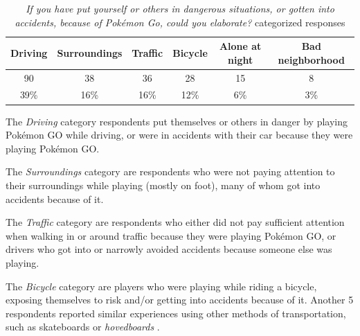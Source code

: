 \begin{table}[h]
	\centering
	\caption{\emph{If you have put yourself or others in dangerous situations, or gotten into accidents, because of Pokémon Go, could you elaborate?} categorized responses}
	\label{tbl:danger-or-accidents-elaboration}
	\begin{tabular}{|c|c|c|c|c|c|}
		\hline
		Driving	& Surroundings	& Traffic	& Bicycle	& Alone at night	& Bad neighborhood\\
		\hline\hline
		90		& 38			& 36		& 28		& 15				& 8\\
		39\%	& 16\%			& 16\%		& 12\%		& 6\%				& 3\%\\\hline
	\end{tabular}
\end{table}

The \emph{Driving} category respondents put themselves or others in danger by playing Pokémon GO while driving, or were in accidents with their car because they were playing Pokémon GO.

The \emph{Surroundings} category are respondents who were not paying attention to their surroundings while playing (mostly on foot), many of whom got into accidents because of it.

The \emph{Traffic} category are respondents who either did not pay sufficient attention when walking in or around traffic because they were playing Pokémon GO, or drivers who got into or narrowly avoided accidents because someone else was playing.

The \emph{Bicycle} category are players who were playing while riding a bicycle, exposing themselves to risk and/or getting into accidents because of it. Another 5 respondents reported similar experiences using other methods of transportation, such as skateboards or \emph{hovedboards} .

